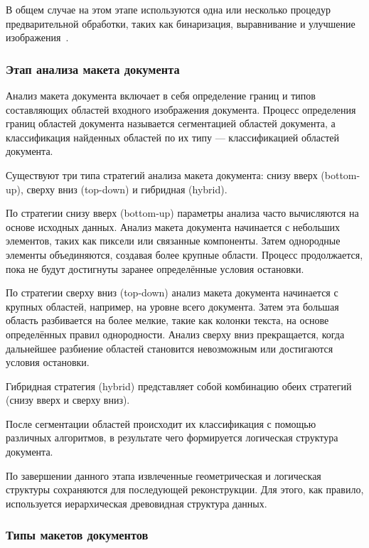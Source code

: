 В общем случае на этом этапе используются одна или несколько процедур предварительной обработки, таких как бинаризация, выравнивание и улучшение изображения~\cite{dla-survey, primer}.

\subsubsection*{Этап анализа макета документа}

Анализ макета документа включает в себя определение границ и типов составляющих областей входного изображения документа.
Процесс определения границ областей документа называется сегментацией областей документа, а классификация найденных областей по их типу --- классификацией областей документа.~\cite{dla-book}

Существуют три типа стратегий анализа макета документа: снизу вверх (bottom-up), сверху вниз (top-down) и гибридная (hybrid).

По стратегии снизу вверх (bottom-up) параметры анализа часто вычисляются на основе исходных данных.
Анализ макета документа начинается с небольших элементов, таких как пиксели или связанные компоненты.
Затем однородные элементы объединяются, создавая более крупные области.
Процесс продолжается, пока не будут достигнуты заранее определённые условия остановки.

По стратегии сверху вниз (top-down) анализ макета документа начинается с крупных областей, например, на уровне всего документа.
Затем эта большая область разбивается на более мелкие, такие как колонки текста, на основе определённых правил однородности.
Анализ сверху вниз прекращается, когда дальнейшее разбиение областей становится невозможным или достигаются условия остановки.

Гибридная стратегия (hybrid) представляет собой комбинацию обеих стратегий (снизу вверх и сверху вниз).~\cite{dla-survey}

После сегментации областей происходит их классификация с помощью различных алгоритмов, в результате чего формируется логическая структура документа.

По завершении данного этапа извлеченные геометрическая и логическая структуры сохраняются для последующей реконструкции.
Для этого, как правило, используется иерархическая древовидная структура данных.~\cite{dla-book}

\newpage

\subsubsection{Типы макетов документов}

